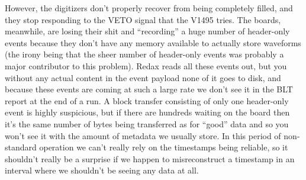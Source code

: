 However, the digitizers don't properly recover from being completely filled, and they stop responding to the VETO signal that the V1495 tries.
The boards, meanwhile, are losing their shit and ``recording'' a huge number of header-only events because they don't have any memory available to actually store waveforms (the irony being that the sheer number of header-only events was probably a major contributor to this problem).
Redax reads all these events out, but you without any actual content in the event payload none of it goes to disk, and because these events are coming at such a large rate we don't see it in the BLT report at the end of a run.
A block transfer consisting of only one header-only event is highly suspicious, but if there are hundreds waiting on the board then it's the same number of bytes being transferred as for ``good'' data and so you won't see it with the amount of metadata we usually store.
In this period of non-standard operation we can't really rely on the timestamps being reliable, so it shouldn't really be a surprise if we happen to misreconstruct a timestamp in an interval where we shouldn't be seeing any data at all.

